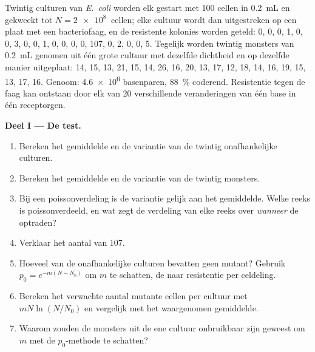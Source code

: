 \begin{problem}
\label{pb:b2:genome-diversification:1}
Twintig culturen van \emph{E.~coli} worden elk gestart met \num{100}
cellen in \qty{0.2}{mL} en gekweekt tot $N = \qty{2e8}{}$ cellen; elke
cultuur wordt dan uitgestreken op een plaat met een bacteriofaag, en de
resistente kolonies worden geteld: 0, 0, 0, 1, 0, 0, 3, 0, 0, 1, 0, 0,
0, 0, 107, 0, 2, 0, 0, 5. Tegelijk worden twintig monsters van
\qty{0.2}{mL} genomen uit één grote cultuur met dezelfde dichtheid en op
dezelfde manier uitgeplaat: 14, 15, 13, 21, 15, 14, 26, 16, 20, 13, 17,
12, 18, 14, 16, 19, 15, 13, 17, 16. Genoom: \qty{4.6e6}{} basenparen,
\qty{88}{\%} coderend. Resistentie tegen de faag kan ontstaan door elk
van \num{20} verschillende veranderingen van één base in één receptorgen.

\medskip
\noindent\textbf{Deel I --- De test.}
\begin{enumerate}
  \item Bereken het gemiddelde en de variantie van de twintig
        onafhankelijke culturen.
  \item Bereken het gemiddelde en de variantie van de twintig monsters.
  \item Bij een poissonverdeling is de variantie gelijk aan het
        gemiddelde. Welke reeks is poissonverdeeld, en wat zegt de
        verdeling van elke reeks over \emph{wanneer} de  optraden?
  \item Verklaar het aantal van 107.
  \item Hoeveel van de onafhankelijke culturen bevatten geen mutant? Gebruik
        $p_0 = e^{-m(N - N_0)}$ om $m$ te schatten, de  naar
        resistentie per celdeling.
  \item Bereken het verwachte aantal mutante cellen per cultuur met
        $mN\ln(N/N_0)$ en vergelijk met het waargenomen gemiddelde.
  \item Waarom zouden de monsters uit de ene cultuur onbruikbaar zijn
        geweest om $m$ met de $p_0$-methode te schatten?
\end{enumerate}


\end{problem}
